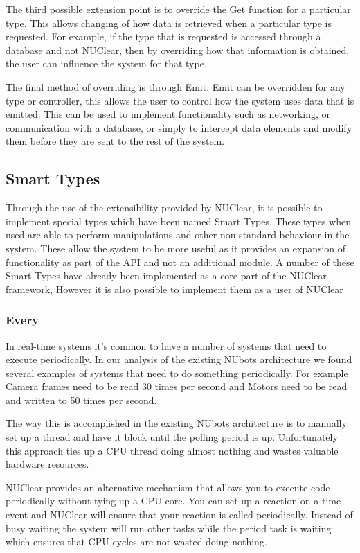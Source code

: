 \documentclass[english,12pt]{scrartcl}
\begin{document}
			The third possible extension point is to override the Get function for a particular type.
			This allows changing of how data is retrieved when a particular type is requested.
			For example, if the type that is requested is accessed through a database and not NUClear, then by overriding how that information is obtained, the user can influence the system for that type.
			
			The final method of overriding is through Emit.
			Emit can be overridden for any type or controller, this allows the user to control how the system uses data that is emitted.
			This can be used to implement functionality such as networking, or communication with a database, or simply to intercept data elements and modify them before they are sent to the rest of the system.
			
		\subsection{Smart Types}
			Through the use of the extensibility provided by NUClear, it is possible to implement special types which have been named Smart Types.
			These types when used are able to perform manipulations and other non standard behaviour in the system.
			These allow the system to be more useful as it provides an expansion of functionality as part of the API and not an additional module.
			A number of these Smart Types have already been implemented as a core part of the NUClear framework, However it is also possible to implement them as a user of NUClear
			
			\subsubsection{Every}
				In real-time systems it's common to have a number of systems that need to execute periodically. 
				In our analysis of the existing NUbots architecture we found several examples of systems that need to do something periodically.
				For example Camera frames need to be read 30 times per second and Motors need to be read and written to 50 times per second. 
				
				The way this is accomplished in the existing NUbots architecture is to manually set up a thread and have it block until the polling period is up. 
				Unfortunately this approach ties up a CPU thread doing almost nothing and wastes valuable hardware resources.
				
				NUClear provides an alternative mechanism that allows you to execute code periodically without tying up a CPU core.
				You can set up a reaction on a time event and NUClear will ensure that your reaction is called periodically. 
				Instead of busy waiting the system will run other tasks while the period task is waiting which ensures that CPU cycles are not wasted doing nothing.
				
\end{document}
